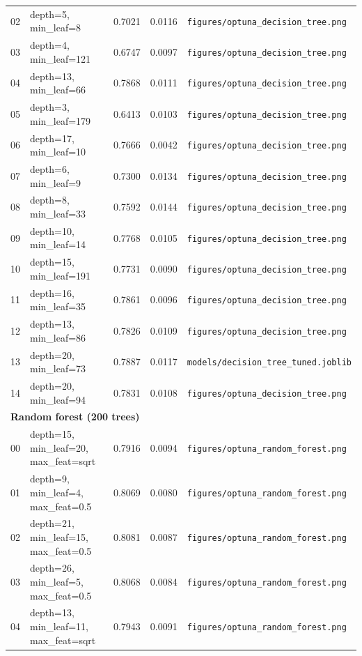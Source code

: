 \documentclass[11pt,a4paper]{article}
\begin{document}
{\begin{longtable}{lp{6.9cm}ccl}
02 & depth=5, min\_leaf=8 & 0.7021 & 0.0116 & \texttt{figures/optuna\_decision\_tree.png}\\
03 & depth=4, min\_leaf=121 & 0.6747 & 0.0097 & \texttt{figures/optuna\_decision\_tree.png}\\
04 & depth=13, min\_leaf=66 & 0.7868 & 0.0111 & \texttt{figures/optuna\_decision\_tree.png}\\
05 & depth=3, min\_leaf=179 & 0.6413 & 0.0103 & \texttt{figures/optuna\_decision\_tree.png}\\
06 & depth=17, min\_leaf=10 & 0.7666 & 0.0042 & \texttt{figures/optuna\_decision\_tree.png}\\
07 & depth=6, min\_leaf=9 & 0.7300 & 0.0134 & \texttt{figures/optuna\_decision\_tree.png}\\
08 & depth=8, min\_leaf=33 & 0.7592 & 0.0144 & \texttt{figures/optuna\_decision\_tree.png}\\
09 & depth=10, min\_leaf=14 & 0.7768 & 0.0105 & \texttt{figures/optuna\_decision\_tree.png}\\
10 & depth=15, min\_leaf=191 & 0.7731 & 0.0090 & \texttt{figures/optuna\_decision\_tree.png}\\
11 & depth=16, min\_leaf=35 & 0.7861 & 0.0096 & \texttt{figures/optuna\_decision\_tree.png}\\
12 & depth=13, min\_leaf=86 & 0.7826 & 0.0109 & \texttt{figures/optuna\_decision\_tree.png}\\
\rowcolor{gray!15} 13 & depth=20, min\_leaf=73 & 0.7887 & 0.0117 & \texttt{models/decision\_tree\_tuned.joblib}\\
14 & depth=20, min\_leaf=94 & 0.7831 & 0.0108 & \texttt{figures/optuna\_decision\_tree.png}\\
\midrule
\multicolumn{5}{l}{\textbf{Random forest (200 trees)}}\\
00 & depth=15, min\_leaf=20, max\_feat=sqrt & 0.7916 & 0.0094 & \texttt{figures/optuna\_random\_forest.png}\\
01 & depth=9, min\_leaf=4, max\_feat=0.5 & 0.8069 & 0.0080 & \texttt{figures/optuna\_random\_forest.png}\\
02 & depth=21, min\_leaf=15, max\_feat=0.5 & 0.8081 & 0.0087 & \texttt{figures/optuna\_random\_forest.png}\\
03 & depth=26, min\_leaf=5, max\_feat=0.5 & 0.8068 & 0.0084 & \texttt{figures/optuna\_random\_forest.png}\\
04 & depth=13, min\_leaf=11, max\_feat=sqrt & 0.7943 & 0.0091 & \texttt{figures/optuna\_random\_forest.png}\\

\end{longtable}}
\end{document}
